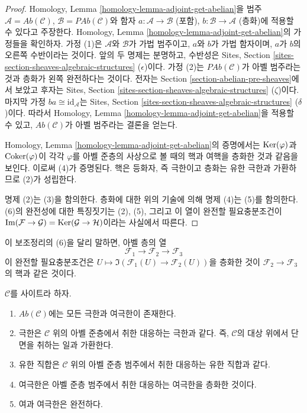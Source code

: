 \begin{proof}
Homology, Lemma \ref{homology-lemma-adjoint-get-abelian}을 범주
$\mathcal{A} = \textit{Ab}(\mathcal{C})$,
$\mathcal{B} = \textit{PAb}(\mathcal{C})$와 함자
$a : \mathcal{A} \to \mathcal{B}$ (포함),
$b : \mathcal{B} \to \mathcal{A}$ (층화)에 적용할 수 있다고 주장한다.
Homology, Lemma \ref{homology-lemma-adjoint-get-abelian}의 가정들을 확인하자.
가정 (1)은 $\mathcal{A}$와 $\mathcal{B}$가 가법 범주이고,
$a$와 $b$가 가법 함자이며, $a$가 $b$의 오른쪽 수반이라는 것이다.
앞의 두 명제는 분명하고, 수반성은 Sites, Section
\ref{sites-section-sheaves-algebraic-structures} ($\epsilon$)이다.
가정 (2)는 $\textit{PAb}(\mathcal{C})$가 아벨 범주라는 것과 층화가
왼쪽 완전하다는 것이다. 전자는 Section \ref{section-abelian-pre-sheaves}에서
보았고 후자는 Sites, Section
\ref{sites-section-sheaves-algebraic-structures} ($\zeta$)이다.
마지막 가정 $ba \cong \text{id}_\mathcal{A}$는 Sites, Section
\ref{sites-section-sheaves-algebraic-structures} ($\delta$)이다.
따라서 Homology, Lemma \ref{homology-lemma-adjoint-get-abelian}을 적용할 수 있고,
$\textit{Ab}(\mathcal{C})$가 아벨 범주라는 결론을 얻는다.

\medskip\noindent
Homology, Lemma \ref{homology-lemma-adjoint-get-abelian}의 증명에서는
$\mathop{\mathrm{Ker}}(\varphi)$과 $\mathop{\mathrm{Coker}}(\varphi)$이 각각 $\varphi$를 아벨 준층의 사상으로
볼 때의 핵과 여핵을 층화한 것과 같음을 보인다. 이로써 (4)가 증명된다.
핵은 등화자, 즉 극한이고 층화는 유한 극한과 가환하므로 (2)가 성립한다.

\medskip\noindent
명제 (2)는 (3)을 함의한다. 층화에 대한 위의 기술에 의해 명제 (4)는 (5)를
함의한다. (6)의 완전성에 대한 특징짓기는 (2), (5), 그리고 이 열이 완전할
필요충분조건이
$\mathop{\mathrm{Im}}(\mathcal{F} \to \mathcal{G}) =
\mathop{\mathrm{Ker}}(\mathcal{G} \to \mathcal{H})$이라는 사실에서 따른다.
\end{proof}

\noindent
이 보조정리의 (6)을 달리 말하면, 아벨 층의 열
$$
\mathcal{F}_1 \longrightarrow
\mathcal{F}_2 \longrightarrow
\mathcal{F}_3
$$
이 완전할 필요충분조건은
$U \mapsto \Im(\mathcal{F}_1(U) \to \mathcal{F}_2(U))$을 층화한 것이
$\mathcal{F}_2 \to \mathcal{F}_3$의 핵과 같은 것이다.

\begin{lemma}
\label{lemma-limits-colimits-abelian-sheaves}
$\mathcal{C}$를 사이트라 하자.
\begin{enumerate}
\item $\textit{Ab}(\mathcal{C})$에는 모든 극한과 여극한이 존재한다.
\item 극한은 $\mathcal{C}$ 위의 아벨 준층에서 취한 대응하는 극한과 같다.
즉, $\mathcal{C}$의 대상 위에서 단면을 취하는 일과 가환한다.
\item 유한 직합은 $\mathcal{C}$ 위의 아벨 준층 범주에서 취한 대응하는
유한 직합과 같다.
\item 여극한은 아벨 준층 범주에서 취한 대응하는 여극한을 층화한 것이다.
\item 여과 여극한은 완전하다.
\end{enumerate}
\end{lemma}

